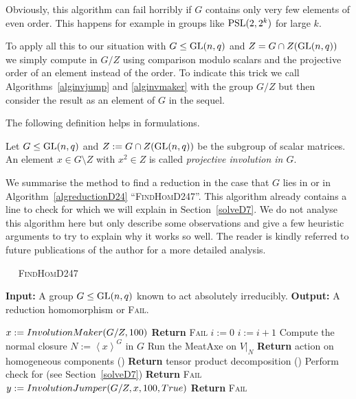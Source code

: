 \begin{Rem}
    Obviously, this algorithm can fail horribly if $G$ contains only
    very few elements of even order. This happens for example in
    groups like $\PSL(2,2^k)$ for large $k$.
\end{Rem}

To apply all this to our situation with $G \le \GL(n,q)$ and
$Z = G \cap Z(\GL(n,q))$ we simply compute in $G/Z$ using
comparison modulo scalars and 
the projective order of an element instead of the order.
To indicate this trick we call Algorithms~\ref{alginvjump} and
\ref{alginvmaker} with the group $G/Z$ but then consider the result as
an element of $G$ in the sequel.

The following definition helps in formulations.

\begin{Def}
%
Let $G \le \GL(n,q)$ and $Z := G \cap Z(\GL(n,q))$ be the subgroup of scalar
matrices. An element $x \in G \setminus Z$ with $x^2 \in Z$ is
called \emph{projective involution in $G$}.
\end{Def}

We summarise the method to find a reduction in the case that $G$ lies in
 or  in Algorithm~\ref{algreductionD24} ``\textsc{FindHomD247}''. 
This algorithm
already contains a line to check for  which we will explain in
Section~\ref{solveD7}. We do not analyse this algorithm here but only
describe some observations and give a few heuristic arguments to try to
explain why it works so well. The reader is kindly referred to future
publications of the author for a more detailed analysis.

\begin{algorithm}
\caption{$\quad$ \textsc{FindHomD247}}
%
\label{algreductionD24}
\begin{algorithmic}
\STATE \textbf{Input:} A group $G \le \GL(n,q)$ known to act absolutely
irreducibly.
\STATE \textbf{Output:} A reduction homomorphism or \textsc{Fail}.

\smallskip
\STATE $x := \textsc{InvolutionMaker}(G/Z,100)$
    \STATE \textbf{Return} \textsc{Fail}
\ENDIF
\STATE $i := 0$
    \STATE $i := i + 1$
    \STATE Compute the normal closure $N := \left< x \right>^G$ in $G$
    \STATE Run the MeatAxe on $V|_N$
            \STATE \textbf{Return} action on homogeneous components ()
            \STATE \textbf{Return} tensor product decomposition ()
        \ENDIF
    \ELSE 
        \STATE Perform check for  (see Section~\ref{solveD7})
    \ENDIF
        \STATE \textbf{Return} \textsc{Fail}
    \ENDIF
    \STATE $y := \textsc{InvolutionJumper}(G/Z,x,100,\textsc{True})$
        \STATE \textbf{Return} \textsc{Fail}
    \ENDIF
\ENDWHILE
\end{algorithmic}
\end{algorithm}

